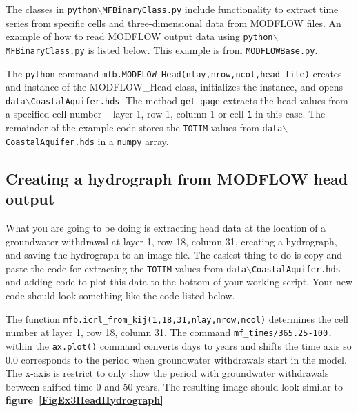 \documentclass[12pt]{article}
\begin{document}
The classes in \texttt{python$\backslash$MFBinaryClass.py} include functionality to extract time series from specific cells and three-dimensional data from MODFLOW files. An example of how to read MODFLOW output data using  \texttt{python$\backslash$MFBinaryClass.py} is listed below. This example is from \texttt{MODFLOWBase.py}.

\begin{center}
	
\end{center}

The \texttt{python} command \texttt{mfb.MODFLOW\_Head(nlay,nrow,ncol,head\_file)} creates and instance of the MODFLOW\_Head class, initializes the instance, and opens \texttt{data$\backslash$Coastal\-Aquifer.hds}. The method \texttt{get\_gage} extracts the head values from a specified cell number -- layer 1, row 1, column 1 or cell \texttt{1} in this case. The remainder of the example code stores the \texttt{TOTIM} values from \texttt{data$\backslash$Coastal\-Aquifer.hds} in a \texttt{numpy} array.

\subsection{Creating a hydrograph from MODFLOW head output}
What you are going to be doing is extracting head data at the location of a groundwater withdrawal at layer 1, row 18, column 31, creating a hydrograph, and saving the hydrograph to an image file. The easiest thing to do is copy and paste the code for extracting the \texttt{TOTIM} values from \texttt{data$\backslash$Coastal\-Aquifer.hds} and adding code to plot this data to the bottom of your working script. Your new code should look something like the code listed below.

\begin{center}
	
\end{center}

The function \texttt{mfb.icrl\_from\_kij(1,18,31,nlay,nrow,ncol)} determines the cell number at layer 1, row 18, column 31. The command \texttt{mf\_times/365.25-100.} within the \texttt{ax.plot()} command converts days to years and shifts the time axis so 0.0 corresponds to the period when groundwater withdrawals start in the model. The x-axis is restrict to only show the period with groundwater withdrawals between shifted time 0 and 50 years. The resulting image should look similar to \textbf{figure~\ref{FigEx3HeadHydrograph}}
\end{document}
